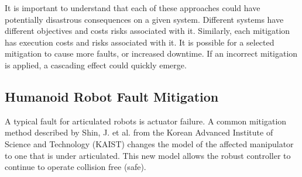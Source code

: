 It is important to understand that each of these approaches could have
potentially disastrous consequences on a given system. Different systems have
different objectives and costs risks associated with it. Similarly, each
mitigation has execution costs and risks associated with it. It is possible for
a selected mitigation to cause more faults, or increased downtime. If an
incorrect mitigation is applied, a cascading effect could quickly emerge.


\subsection{Humanoid Robot Fault Mitigation}
\label{sub:humanoidRobotFaultMitigation}
A typical fault for articulated robots is actuator failure.  A common
mitigation method described by Shin, J. et al.\cite{772398} from the Korean
Advanced Institute of Science and Technology (KAIST) changes the model of the
affected manipulator to one that is under articulated.  This new model allows
the robust controller to continue to operate collision free (safe).
